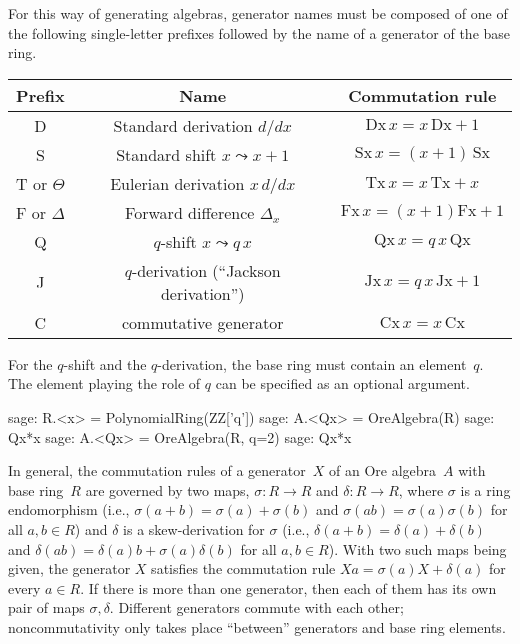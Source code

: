 \documentclass[11pt]{amsart}
\begin{document}
For this way of generating algebras, generator names must be composed of
one of the following single-letter prefixes followed by the name of a generator
of the base ring. 

\begin{center}
  \begin{tabular}{|c|c|c|}\hline
    Prefix & Name & Commutation rule \\\hline
     D & Standard derivation $d/dx$ & $\mathrm{Dx}\,x=x\,\mathrm{Dx}+1$ \\
     S & Standard shift $x\leadsto x+1$ & $\mathrm{Sx}\,x=(x+1)\,\mathrm{Sx}$ \\
     T or $\Theta$ & Eulerian derivation $x\,d/dx$ & $\mathrm{Tx}\,x=x\,\mathrm{Tx}+x$ \\
     F or $\Delta$ & Forward difference $\Delta_x$ & $\mathrm{Fx}\,x=(x+1)\mathrm{Fx}+1$ \\
     Q & $q$-shift $x\leadsto q\,x$ & $\mathrm{Qx}\,x=q\,x\,\mathrm{Qx}$ \\
     J & $q$-derivation (``Jackson derivation'') & $\mathrm{Jx}\,x=q\,x\,\mathrm{Jx}+1$ \\ 
     C & commutative generator & $\mathrm{Cx}\,x = x\,\mathrm{Cx}$ \\\hline
  \end{tabular}
\end{center}

For the $q$-shift and the $q$-derivation, the base ring must contain an element~$q$.
The element playing the role of $q$ can be specified as an optional argument. 

\begin{sageexample}
  sage: R.<x> = PolynomialRing(ZZ['q'])
  sage: A.<Qx> = OreAlgebra(R)
  sage: Qx*x
  sage: A.<Qx> = OreAlgebra(R, q=2)
  sage: Qx*x
\end{sageexample}

In general, the commutation rules of a generator~$X$ of an Ore algebra~$A$ with
base ring~$R$ are governed by two maps, $\sigma\colon R\to R$ and $\delta\colon R\to R$,
where $\sigma$ is a ring endomorphism (i.e., $\sigma(a+b)=\sigma(a)+\sigma(b)$ and
$\sigma(ab)=\sigma(a)\sigma(b)$ for all $a,b\in R$) and $\delta$ is a skew-derivation
for $\sigma$ (i.e., $\delta(a+b)=\delta(a)+\delta(b)$ and $\delta(ab)=\delta(a)b
+\sigma(a)\delta(b)$ for all $a,b\in R$). With two such maps being given, the
generator $X$ satisfies the commutation rule $Xa=\sigma(a)X+\delta(a)$ for every
$a\in R$. If there is more than one generator, then each of them has its own pair
of maps $\sigma,\delta$. Different generators commute with each other; 
noncommutativity only takes place ``between'' generators and base ring elements. 
\end{document}
